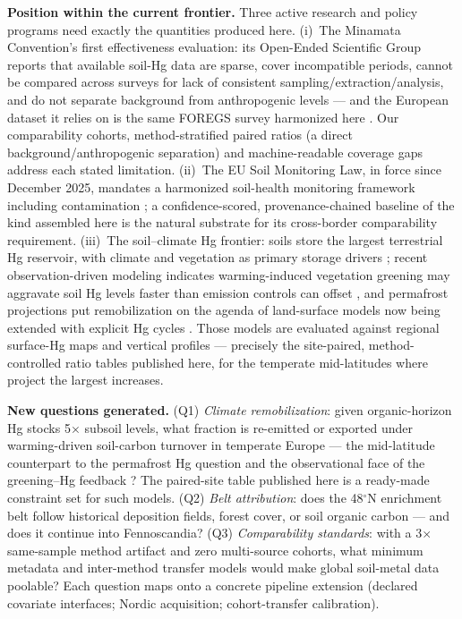 \documentclass[11pt]{article}
\begin{document}
\textbf{Position within the current frontier.} Three active research and
policy programs need exactly the quantities produced here. (i)~The Minamata
Convention's first effectiveness evaluation: its Open-Ended Scientific Group
reports that available soil-Hg data are sparse, cover incompatible periods,
cannot be compared across surveys for lack of consistent
sampling/extraction/analysis, and do not separate background from
anthropogenic levels --- and the European dataset it relies on is the same
FOREGS survey harmonized here \cite{unep2025}. Our comparability cohorts,
method-stratified paired ratios (a direct background/anthropogenic
separation) and machine-readable coverage gaps address each stated
limitation. (ii)~The EU Soil Monitoring Law, in force since December 2025,
mandates a harmonized soil-health monitoring framework including
contamination \cite{eusml2025}; a confidence-scored, provenance-chained
baseline of the kind assembled here is the natural substrate for its
cross-border comparability requirement. (iii)~The soil--climate Hg
frontier: soils store the largest terrestrial Hg reservoir, with climate and
vegetation as primary storage drivers \cite{wang2019}; recent
observation-driven modeling indicates warming-induced vegetation greening
may aggravate soil Hg levels faster than emission controls can offset
\cite{liu2024}, and permafrost projections put remobilization on the agenda
of land-surface models now being extended with explicit Hg cycles
\cite{schaefer2020}. Those models are evaluated against regional surface-Hg
maps and vertical profiles --- precisely the site-paired, method-controlled
ratio tables published here, for the temperate mid-latitudes where
\cite{liu2024} project the largest increases.

\textbf{New questions generated.} (Q1) \emph{Climate remobilization}: given
organic-horizon Hg stocks 5$\times$ subsoil levels, what fraction is
re-emitted or exported under warming-driven soil-carbon turnover in temperate
Europe --- the mid-latitude counterpart to the permafrost Hg question
\cite{schuster2018,schaefer2020} and the observational face of the
greening--Hg feedback \cite{liu2024}? The paired-site table published here
is a ready-made constraint set for such models. (Q2) \emph{Belt attribution}: does
the 48$^{\circ}$N enrichment belt follow historical deposition fields,
forest cover, or soil organic carbon --- and does it continue into
Fennoscandia? (Q3) \emph{Comparability standards}: with a 3$\times$
same-sample method artifact and zero multi-source cohorts, what minimum
metadata and inter-method transfer models would make global soil-metal data
poolable? Each question maps onto a concrete pipeline extension (declared
covariate interfaces; Nordic acquisition; cohort-transfer calibration).
\end{document}
